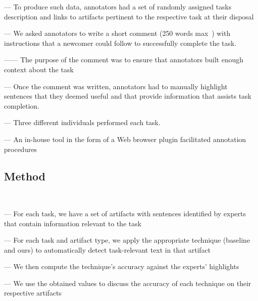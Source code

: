 

--- To produce such data, annotators had a set of randomly assigned tasks description and links to artifacts 
pertinent to the respective task at their disposal \vspace{3mm}

--- We asked annotators to write a short comment (250 words max~\cite{Rastkar2010}) with instructions that a newcomer could follow to successfully complete the task.


------ The purpose of the comment was to ensure that annotators built enough context about the task \vspace{3mm}

--- Once the comment was written,  annotators had to manually highlight sentences that they deemed useful and that provide information that assists task completion.

--- Three different individuals performed each task. \vspace{3mm}

--- An in-house tool in the form of a Web browser plugin facilitated annotation procedures

\subsection{Method}
\textcolor{white}{force ident} %


--- For each task, we have a set of artifacts with sentences identified by experts that contain information relevant to the task \vspace{3mm}

--- For each task and artifact type, we apply the appropriate technique (baseline and ours) to automatically detect task-relevant text in that artifact


--- We then compute the technique's accuracy against the experts' highlights 

--- We use the obtained values to discuss the accuracy of each technique on their respective artifacts



